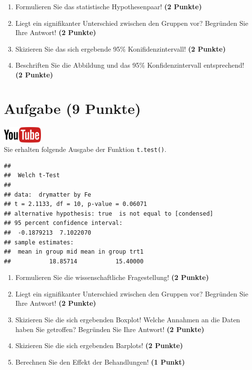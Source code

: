 \documentclass[a4paper, 9pt]{scrartcl}\usepackage[]{graphicx}\usepackage[]{xcolor}
\makeatletter
\newenvironment{kframe}{%
 \def\at@end@of@kframe{}%
 \ifinner\ifhmode%
  \def\at@end@of@kframe{\end{minipage}}%
  \begin{minipage}{\columnwidth}%
 \fi\fi%
 \def\FrameCommand##1{\hskip\@totalleftmargin \hskip-\fboxsep
 \colorbox{shadecolor}{##1}\hskip-\fboxsep
     \hskip-\linewidth \hskip-\@totalleftmargin \hskip\columnwidth}%
 \MakeFramed {\advance\hsize-\width
   \@totalleftmargin\z@ \linewidth\hsize
   \@setminipage}}%
 {\par\unskip\endMakeFramed%
 \at@end@of@kframe}
\newenvironment{knitrout}{}{} %
\makeatother
\begin{document}
\begin{enumerate}
  \item Formulieren Sie das statistische Hypothesenpaar! \textbf{(2
Punkte)}
\item Liegt ein signifikanter Unterschied zwischen den Gruppen vor?
  Begr{\"u}nden Sie Ihre Antwort! \textbf{(2 Punkte)}
\item Skizieren Sie das sich ergebende 95\% Konifidenzintervall! \textbf{(2 Punkte)}
\item Beschriften Sie die Abbildung und
  das 95\% Konfidenzintervall entsprechend! \textbf{(2 Punkte)}  
\end{enumerate} 
\clearpage

\section{Aufgabe \hfill (9 Punkte)}

\hfill\href{https://youtu.be/w62HJlbN28U}{\includegraphics[width =
  2cm]{img/youtube}}\\[1Ex]

Sie erhalten folgende \Rlogo Ausgabe der Funktion \texttt{t.test()}.

\begin{knitrout}
\color{fgcolor}\begin{kframe}
\begin{verbatim}
## 
## 	Welch t-Test
## 
## data:  drymatter by Fe
## t = 2.1133, df = 10, p-value = 0.06071
## alternative hypothesis: true  is not equal to [condensed]
## 95 percent confidence interval:
##  -0.1879213  7.1022070
## sample estimates:
##  mean in group mid mean in group trt1 
##           18.85714           15.40000
\end{verbatim}
\end{kframe}
\end{knitrout}


\begin{enumerate}
  \item Formulieren Sie die wissenschaftliche Fragestellung! \textbf{(2
Punkte)}
\item Liegt ein signifikanter Unterschied zwischen den Gruppen vor?
  Begr{\"u}nden Sie Ihre Antwort! \textbf{(2 Punkte)}
\item Skizieren Sie die sich ergebenden Boxplot!
  Welche Annahmen an die Daten haben Sie getroffen? Begr{\"u}nden Sie Ihre
  Antwort! \textbf{(2 Punkte)} 
\item Skizieren Sie die sich ergebenden Barplots! \textbf{(2 Punkte)}
\item Berechnen Sie den Effekt der Behandlungen! \textbf{(1 Punkt)} 
\end{enumerate}
 
\end{document}
